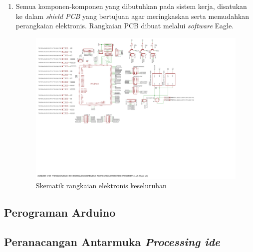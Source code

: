 \begin{enumerate}
\item Semua komponen-komponen yang dibutuhkan pada sistem kerja, disatukan ke dalam \textit{shield PCB} yang bertujuan agar meringkaskan serta memudahkan perangkaian elektronis. Rangkaian PCB dibuat melalui \textit{software} Eagle.
\begin{figure}[H]
	\centering
	\includegraphics[width=15cm	]{skematik.pdf}
	\caption{Skematik rangkaian elektronis keseluruhan}
\end{figure}


		\end{enumerate}
	
\subsection{Perograman Arduino}
\subsection{Peranacangan Antarmuka \textit{Processing ide}}
	

